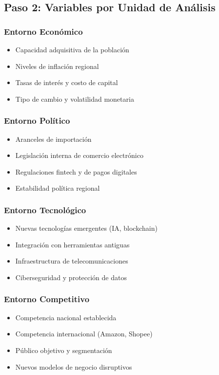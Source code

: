 \subsection{Paso 2: Variables por Unidad de Análisis}

\subsubsection{Entorno Económico}
\begin{itemize}
\item Capacidad adquisitiva de la población
\item Niveles de inflación regional
\item Tasas de interés y costo de capital
\item Tipo de cambio y volatilidad monetaria
\end{itemize}

\subsubsection{Entorno Político}
\begin{itemize}
\item Aranceles de importación
\item Legislación interna de comercio electrónico
\item Regulaciones fintech y de pagos digitales
\item Estabilidad política regional
\end{itemize}

\subsubsection{Entorno Tecnológico}
\begin{itemize}
\item Nuevas tecnologías emergentes (IA, blockchain)
\item Integración con herramientas antiguas
\item Infraestructura de telecomunicaciones
\item Ciberseguridad y protección de datos
\end{itemize}

\subsubsection{Entorno Competitivo}
\begin{itemize}
\item Competencia nacional establecida
\item Competencia internacional (Amazon, Shopee)
\item Público objetivo y segmentación
\item Nuevos modelos de negocio disruptivos
\end{itemize}

